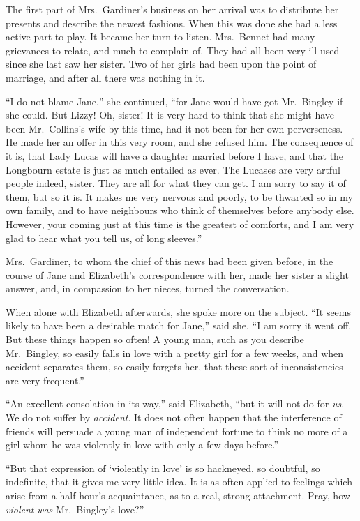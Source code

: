 \documentclass[12pt,english,oneside]{book}
\begin{document}
The first part of Mrs.\ Gardiner's business on her arrival was to
distribute her presents and describe the newest fashions. When this
was done she had a less active part to play. It became her turn to
listen. Mrs.\ Bennet had many grievances to relate, and much to complain
of. They had all been very ill-used since she last saw her sister.
Two of her girls had been upon the point of marriage, and after all
there was nothing in it.

{}``I do not blame Jane,'' she continued, {}``for Jane would have
got Mr.\ Bingley if she could. But Lizzy! Oh, sister! It is very
hard to think that she might have been Mr.\ Collins's wife by this
time, had it not been for her own perverseness. He made her an offer
in this very room, and she refused him. The consequence of it is,
that Lady Lucas will have a daughter married before I have, and that
the Longbourn estate is just as much entailed as ever. The Lucases
are very artful people indeed, sister. They are all for what they
can get. I am sorry to say it of them, but so it is. It makes me very
nervous and poorly, to be thwarted so in my own family, and to have
neighbours who think of themselves before anybody else. However, your
coming just at this time is the greatest of comforts, and I am very
glad to hear what you tell us, of long sleeves.''

Mrs.\ Gardiner, to whom the chief of this news had been given before,
in the course of Jane and Elizabeth's correspondence with her, made
her sister a slight answer, and, in compassion to her nieces, turned
the conversation.

When alone with Elizabeth afterwards, she spoke more on the subject.
{}``It seems likely to have been a desirable match for Jane,'' said
she. {}``I am sorry it went off. But these things happen so often!
A young man, such as you describe Mr.\ Bingley, so easily falls in
love with a pretty girl for a few weeks, and when accident separates
them, so easily forgets her, that these sort of inconsistencies are
very frequent.''

{}``An excellent consolation in its way,'' said Elizabeth, {}``but
it will not do for \textit{us}. We do not suffer by \textit{accident}.
It does not often happen that the interference of friends will persuade
a young man of independent fortune to think no more of a girl whom
he was violently in love with only a few days before.''

{}``But that expression of `violently in love' is so hackneyed, so
doubtful, so indefinite, that it gives me very little idea. It is
as often applied to feelings which arise from a half-hour's acquaintance,
as to a real, strong attachment. Pray, how \textit{violent} \textit{was}
Mr.\ Bingley's love?''\ 
\end{document}
